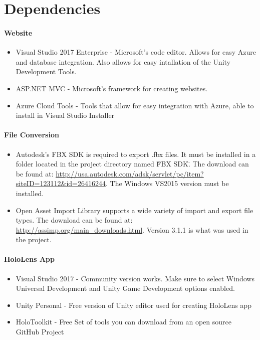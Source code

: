 \section{Dependencies}
\paragraph{Website}
\begin{itemize}
    \item Visual Studio 2017 Enterprise - Microsoft's code editor. Allows for easy Azure and database
    integration. Also allows for easy intallation of the Unity Development Tools.
    \item ASP.NET MVC - Microsoft's framework for creating websites.
    \item Azure Cloud Tools - Tools that allow for easy integration with Azure, able to install in Visual Studio Installer
\end{itemize}

\paragraph{File Conversion}
\begin{itemize}
    \item Autodesk's FBX SDK is required to export .fbx files.  It must be installed in a folder located in the project directory named \"FBX SDK\".  The download can be found at: 
    \url{http://usa.autodesk.com/adsk/servlet/pc/item?siteID=123112&id=26416244}.
    The Windows VS2015 version must be installed.

    \item Open Asset Import Library supports a wide variety of import and export file types.  The download can be found at: \url{http://assimp.org/main_downloads.html}.  Version 3.1.1 is what was used in the project.         
\end{itemize}

\paragraph{HoloLens App}
\begin{itemize}
    \item Visual Studio 2017 - Community version works.  Make sure to select Windows Universal Development and Unity Game Development options enabled.
    
    \item Unity Personal - Free version of Unity editor used for creating HoloLens app

    \item HoloToolkit - Free Set of tools you can download from an open source GitHub Project
\end{itemize}

